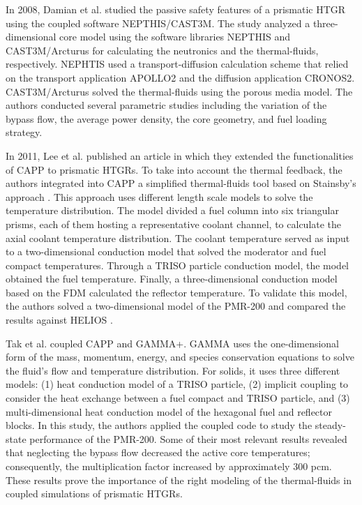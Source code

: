 In 2008, Damian et al. \cite{damian_vhtr_2008} studied the passive safety features of a prismatic HTGR using the coupled software NEPTHIS/CAST3M\cite{cavalier_presentation_2005}\cite{studer_cast3marcturus_2007}.
The study analyzed a three-dimensional core model using the software libraries NEPTHIS and CAST3M/Arcturus for calculating the neutronics and the thermal-fluids, respectively.
NEPHTIS used a transport-diffusion calculation scheme that relied on the transport application APOLLO2 \cite{sanchez_apollo2_1999} and the diffusion application CRONOS2.
CAST3M/Arcturus solved the thermal-fluids using the porous media model.
The authors conducted several parametric studies including the variation of the bypass flow, the average power density, the core geometry, and fuel loading strategy.

In 2011, Lee et al. published an article \cite{lee_development_2011} in which they extended the functionalities of CAPP to prismatic HTGRs.
To take into account the thermal feedback, the authors integrated into CAPP a simplified thermal-fluids tool based on Stainsby's approach \cite{stainsby_investigation_2008}.
This approach uses different length scale models to solve the temperature distribution.
The model divided a fuel column into six triangular prisms, each of them hosting a representative coolant channel, to calculate the axial coolant temperature distribution.
The coolant temperature served as input to a two-dimensional conduction model that solved the moderator and fuel compact temperatures.
Through a TRISO particle conduction model, the model obtained the fuel temperature.
Finally, a three-dimensional conduction model based on the \gls{FDM} calculated the reflector temperature.
To validate this model, the authors solved a two-dimensional model of the PMR-200 and compared the results against HELIOS \cite{stammler_helios_1998}.

Tak et al. \cite{tak_cappgamma_2016} coupled CAPP and GAMMA+.
GAMMA uses the one-dimensional form of the mass, momentum, energy, and species conservation equations to solve the fluid's flow and temperature distribution.
For solids, it uses three different models: (1) heat conduction model of a TRISO particle, (2) implicit coupling to consider the heat exchange between a fuel compact and TRISO particle, and (3) multi-dimensional heat conduction model of the hexagonal fuel and reflector blocks.
In this study, the authors applied the coupled code to study the steady-state performance of the PMR-200.
Some of their most relevant results revealed that neglecting the bypass flow decreased the active core temperatures; consequently, the multiplication factor increased by approximately 300 pcm.
These results prove the importance of the right modeling of the thermal-fluids in coupled simulations of prismatic HTGRs.


